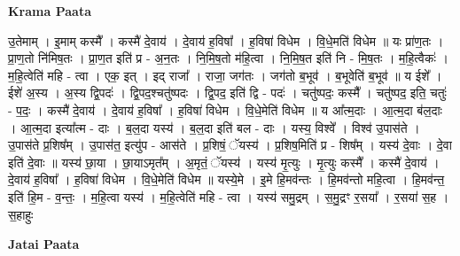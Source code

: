 \documentclass[17pt]{extarticle}
\begin{document}
\textbf{Krama Paata} \newline

उ॒तेमाम् । इ॒माम् कस्मै᳚ । कस्मै॑ दे॒वाय॑ । दे॒वाय॑ ह॒विषा᳚ । ह॒विषा॑ विधेम । वि॒धे॒मति॑ विधेम ॥ यः प्रा॑ण॒तः । प्रा॒ण॒तो नि॑मिष॒तः । प्रा॒ण॒त इति॑ प्र - अ॒न॒तः । नि॒मि॒ष॒तो म॑हि॒त्वा । नि॒मि॒ष॒त इति॑ नि - मि॒ष॒तः । म॒हि॒त्वैकः॑ । म॒हि॒त्वेति॑ महि - त्वा । एक॒ इत् । इद् राजा᳚ । राजा॒ जग॑तः । जग॑तो ब॒भूव॑ । ब॒भूवेति॑ ब॒भूव॑ ॥ य ईशे᳚ । ईशे॑ अ॒स्य । अ॒स्य द्वि॒पदः॑ । द्वि॒पद॒श्चतु॑ष्पदः । द्वि॒पद॒ इति॑ द्वि - पदः॑ । चतु॑ष्पदः॒ कस्मै᳚ । चतु॑ष्पद॒ इति॒ चतुः॑ - प॒दः॒ । कस्मै॑ दे॒वाय॑ । दे॒वाय॑ ह॒विषा᳚ । ह॒विषा॑ विधेम । वि॒धे॒मेति॑ विधेम ॥ य आ᳚त्म॒दाः । आ॒त्म॒दा ब॑ल॒दाः । आ॒त्म॒दा इत्या᳚त्म - दाः । ब॒ल॒दा यस्य॑ । ब॒ल॒दा इति॑ बल - दाः । यस्य॒ विश्वे᳚ । विश्व॑ उ॒पास॑ते । उ॒पास॑ते प्र॒शिष᳚म् । उ॒पास॑त॒ इत्यु॑प - आस॑ते । प्र॒शिषं॒ ॅयस्य॑ । प्र॒शिष॒मिति॑ प्र - शिष᳚म् । यस्य॑ दे॒वाः । दे॒वा इति॑ दे॒वाः ॥ यस्य॑ छा॒या । छा॒याऽमृत᳚म् । अ॒मृतं॒ ॅयस्य॑ । यस्य॑ मृ॒त्युः । मृ॒त्युः कस्मै᳚ । कस्मै॑ दे॒वाय॑ । दे॒वाय॑ ह॒विषा᳚ । ह॒विषा॑ विधेम । वि॒धे॒मेति॑ विधेम ॥ यस्ये॒मे । इ॒मे हि॒मव॑न्तः । हि॒मव॑न्तो महि॒त्वा । हि॒मव॑न्त॒ इति॑ हि॒म - व॒न्तः॒ । म॒हि॒त्वा यस्य॑ । म॒हि॒त्वेति॑ महि - त्वा । यस्य॑ समु॒द्रम् । स॒मु॒द्रꣳ र॒सया᳚ । र॒सया॑ स॒ह । स॒हाहुः \newline

\textbf{Jatai Paata} \newline
\end{document}
